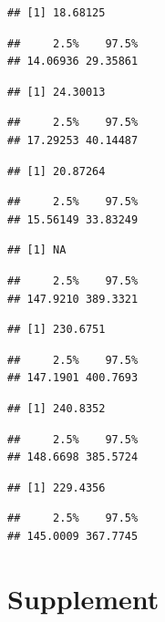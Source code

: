 \documentclass[
]{article}
\begin{document}
\begin{verbatim}
## [1] 18.68125
\end{verbatim}

\begin{verbatim}
##     2.5%    97.5% 
## 14.06936 29.35861
\end{verbatim}

\begin{verbatim}
## [1] 24.30013
\end{verbatim}

\begin{verbatim}
##     2.5%    97.5% 
## 17.29253 40.14487
\end{verbatim}

\begin{verbatim}
## [1] 20.87264
\end{verbatim}

\begin{verbatim}
##     2.5%    97.5% 
## 15.56149 33.83249
\end{verbatim}

\begin{verbatim}
## [1] NA
\end{verbatim}

\begin{verbatim}
##     2.5%    97.5% 
## 147.9210 389.3321
\end{verbatim}

\begin{verbatim}
## [1] 230.6751
\end{verbatim}

\begin{verbatim}
##     2.5%    97.5% 
## 147.1901 400.7693
\end{verbatim}

\begin{verbatim}
## [1] 240.8352
\end{verbatim}

\begin{verbatim}
##     2.5%    97.5% 
## 148.6698 385.5724
\end{verbatim}

\begin{verbatim}
## [1] 229.4356
\end{verbatim}

\begin{verbatim}
##     2.5%    97.5% 
## 145.0009 367.7745
\end{verbatim}

\section{Supplement}\label{supplement}
\end{document}
